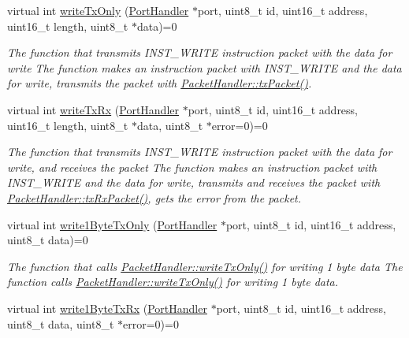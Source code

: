 \begin{DoxyCompactItemize}
virtual int \hyperlink{classmercury_1_1_packet_handler_acf4e01987186250221603f794e7e4b59}{write\+Tx\+Only} (\hyperlink{classmercury_1_1_port_handler}{Port\+Handler} $\ast$port, uint8\+\_\+t id, uint16\+\_\+t address, uint16\+\_\+t length, uint8\+\_\+t $\ast$data)=0
\begin{DoxyCompactList}\small\item\em The function that transmits I\+N\+S\+T\+\_\+\+W\+R\+I\+TE instruction packet with the data for write  The function makes an instruction packet with I\+N\+S\+T\+\_\+\+W\+R\+I\+TE and the data for write,  transmits the packet with \hyperlink{classmercury_1_1_packet_handler_acc3f84f0d952dc2d827d8500de512abe}{Packet\+Handler\+::tx\+Packet()}. \end{DoxyCompactList}\item 
virtual int \hyperlink{classmercury_1_1_packet_handler_adf35a5000d465bd5426530e34a91a21d}{write\+Tx\+Rx} (\hyperlink{classmercury_1_1_port_handler}{Port\+Handler} $\ast$port, uint8\+\_\+t id, uint16\+\_\+t address, uint16\+\_\+t length, uint8\+\_\+t $\ast$data, uint8\+\_\+t $\ast$error=0)=0
\begin{DoxyCompactList}\small\item\em The function that transmits I\+N\+S\+T\+\_\+\+W\+R\+I\+TE instruction packet with the data for write, and receives the packet  The function makes an instruction packet with I\+N\+S\+T\+\_\+\+W\+R\+I\+TE and the data for write,  transmits and receives the packet with \hyperlink{classmercury_1_1_packet_handler_ac7ceeaec210827d119199144badaad3a}{Packet\+Handler\+::tx\+Rx\+Packet()},  gets the error from the packet. \end{DoxyCompactList}\item 
virtual int \hyperlink{classmercury_1_1_packet_handler_a21553798faa86c41203ab41a5c930938}{write1\+Byte\+Tx\+Only} (\hyperlink{classmercury_1_1_port_handler}{Port\+Handler} $\ast$port, uint8\+\_\+t id, uint16\+\_\+t address, uint8\+\_\+t data)=0
\begin{DoxyCompactList}\small\item\em The function that calls \hyperlink{classmercury_1_1_packet_handler_acf4e01987186250221603f794e7e4b59}{Packet\+Handler\+::write\+Tx\+Only()} for writing 1 byte data  The function calls \hyperlink{classmercury_1_1_packet_handler_acf4e01987186250221603f794e7e4b59}{Packet\+Handler\+::write\+Tx\+Only()} for writing 1 byte data. \end{DoxyCompactList}\item 
virtual int \hyperlink{classmercury_1_1_packet_handler_a23576f2a57fb0bb66797b8a3a1935cd1}{write1\+Byte\+Tx\+Rx} (\hyperlink{classmercury_1_1_port_handler}{Port\+Handler} $\ast$port, uint8\+\_\+t id, uint16\+\_\+t address, uint8\+\_\+t data, uint8\+\_\+t $\ast$error=0)=0

\end{DoxyCompactItemize}
